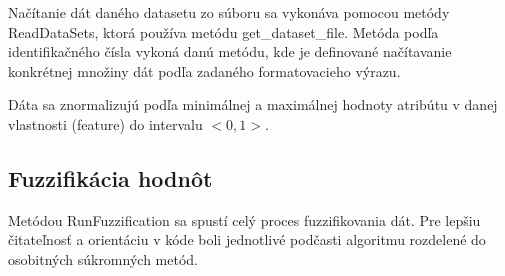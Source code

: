 Načítanie dát daného datasetu zo súboru sa vykonáva pomocou metódy ReadDataSets, ktorá používa metódu get\_dataset\_file. 
Metóda podľa identifikačného čísla vykoná danú metódu, kde je definované načítavanie konkrétnej množiny dát podľa zadaného formatovacieho výrazu. 

Dáta sa znormalizujú podľa minimálnej a maximálnej hodnoty atribútu v danej vlastnosti (feature) do intervalu $<0,1>$. 

\subsection{Fuzzifikácia hodnôt}
Metódou RunFuzzification sa spustí celý proces fuzzifikovania dát. Pre lepšiu čitateľnosť a orientáciu v kóde boli  jednotlivé podčasti algoritmu rozdelené do osobitných súkromných metód. 


